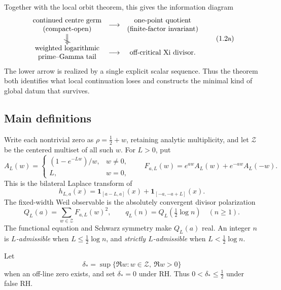 \documentclass[11pt]{article}
\newcommand{\cZ}{\mathcal Z}
\begin{document}
Together with the local orbit theorem, this gives the information diagram
\[
\begin{array}{ccc}
\begin{gathered}\text{continued centre germ}\\[-1mm]\text{(compact-open)}\end{gathered}
 &\longrightarrow&
\begin{gathered}\text{one-point quotient}\\[-1mm]\text{(finite-factor invariant)}\end{gathered}\\[2mm]
\rotatebox{90}{\(\not\!\Longleftarrow\)}
&&\\[-1mm]
\begin{gathered}\text{weighted logarithmic}\\[-1mm]\text{prime--Gamma tail}\end{gathered}
 &\longrightarrow&
\text{off-critical Xi divisor}.
\end{array}
\tag{1.2a}
\]
The lower arrow is realized by a single explicit scalar sequence.  Thus the theorem both
identifies what local continuation loses and constructs the minimal kind of global datum that
survives.

\subsection{Main definitions}

Write each nontrivial zero as \(\rho=\frac12+w\), retaining analytic multiplicity, and let
\(\cZ\) be the centered multiset of all such \(w\).  For \(L>0\), put
\[
 A_L(w)=
 \begin{cases}
  (1-e^{-Lw})/w,&w\ne0,\\
  L,&w=0,
 \end{cases}
 \qquad
 F_{a,L}(w)=e^{aw}A_L(w)+e^{-aw}A_L(-w).
 \tag{1.3}
\]
This is the bilateral Laplace transform of
\[
 h_{L,a}(x)=\mathbf 1_{[a-L,a]}(x)+\mathbf 1_{[-a,-a+L]}(x).
 \tag{1.4}
\]
The fixed-width Weil observable is the absolutely convergent divisor polarization
\[
 Q_L(a)=\sum_{w\in\cZ}F_{a,L}(w)^2,
 \qquad
 q_L(n)=Q_L\!\left(\tfrac12\log n\right)\quad(n\ge1).
 \tag{1.5}
\]
The functional equation and Schwarz symmetry make \(Q_L(a)\) real.  An integer \(n\) is
\emph{\(L\)-admissible} when \(L\le\frac12\log n\), and \emph{strictly \(L\)-admissible} when
\(L<\frac12\log n\).

Let
\[
 \delta_*=\sup\{\Re w:w\in\cZ,\ \Re w>0\}
 \tag{1.6}
\]
when an off-line zero exists, and set \(\delta_*=0\) under RH.  Thus
\(0<\delta_*\le\frac12\) under false RH.
\end{document}
